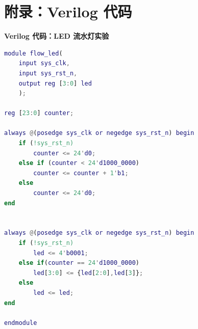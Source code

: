 \documentclass[UTF8]{article}
\theoremstyle{MyLineTheoremStyle} %
\theoremstyle{MyBlockTheoremStyle} %
\theoremstyle{MySubsubsectionStyle} %
\begin{document}
\section{附录：Verilog 代码}

\textbf{Verilog 代码：LED 流水灯实验}
\begin{lstlisting}[language=Matlab, style=MatlabStyle_src]
module flow_led(
	input sys_clk,
	input sys_rst_n,
	output reg [3:0] led
	);
	
reg [23:0] counter;

always @(posedge sys_clk or negedge sys_rst_n) begin
	if (!sys_rst_n)
		counter <= 24'd0;
	else if (counter < 24'd1000_0000)
		counter <= counter + 1'b1;
	else
		counter <= 24'd0;
end


always @(posedge sys_clk or negedge sys_rst_n) begin
	if (!sys_rst_n)
		led <= 4'b0001;
	else if(counter == 24'd1000_0000)
		led[3:0] <= {led[2:0],led[3]};
	else
		led <= led;
end

endmodule

\end{lstlisting}

\cleardoublepage
\end{document}
